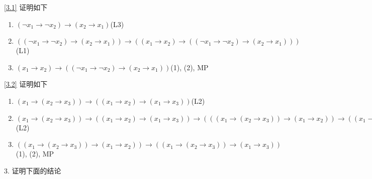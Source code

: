 \documentclass[boxes]{homework}
\begin{document}
\begin{solution}
    \ref{3.1} 证明如下
    \begin{enumerate}[label = (\arabic*)]
        \item $(\lnot x_1\to \lnot x_2)\to (x_2\to x_1)$\hfill (L3)
        \item $((\lnot x_1\to \lnot x_2)\to (x_2\to x_1))\to ((x_1\to x_2)\to ((\lnot x_1\to \lnot x_2)\to (x_2\to x_1)))$ \hfill (L1)
        \item $(x_1\to x_2)\to ((\lnot x_1\to \lnot x_2)\to (x_2\to x_1))$\hfill (1), (2), MP
    \end{enumerate}
    \ref{3.2} 证明如下
    \begin{enumerate}[label = (\arabic*)]
        \item $(x_1\to (x_2\to x_3))\to ((x_1\to x_2)\to (x_1\to x_3))$\hfill (L2)
        \item $(x_1\to (x_2\to x_3))\to ((x_1\to x_2)\to (x_1\to x_3))\to (((x_1\to (x_2\to x_3))\to (x_1\to x_2))\to ((x_1\to (x_2\to x_3))\to (x_1\to x_3)))$\hfill (L2)
        \item $((x_1\to (x_2\to x_3))\to (x_1\to x_2))\to ((x_1\to (x_2\to x_3))\to (x_1\to x_3))$\hfill (1), (2), MP
    \end{enumerate}
\end{solution}
\begin{problem}
3. 证明下面的结论
\end{problem}
\end{document}
